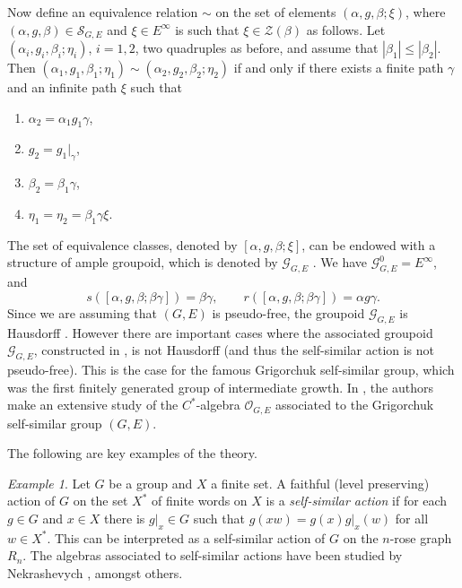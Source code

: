 \documentclass[11pt]{amsart}
\theoremstyle{plain}            %
\theoremstyle{definition}       %
\theoremstyle{definition}       %
\theoremstyle{remark}
\newtheorem{example}[theorem]{Example}
\begin{document}
Now define an equivalence relation $\sim$ on the set of elements $(\alpha,g, \beta;\xi)$, where $(\alpha,g,\beta)\in \mathcal S_{G,E}$ and $\xi \in E^{\infty}$ is such that $\xi \in \mathcal Z (\beta)$ as follows. Let $(\alpha_i,g_i,\beta_i; \eta_i)$, $i=1,2$, two quadruples as before, and assume that $|\beta_1| \le |\beta_2|$. Then $(\alpha_1,g_1,\beta_1; \eta_1)\sim (\alpha_2,g_2,\beta_2; \eta_2)$ if and only if there exists a finite path $\gamma $ and an infinite path $\xi$ such that
\begin{enumerate}
	\item $\alpha_2= \alpha _1 g_1 \gamma $,
	\item $g_2 = g_1|_{\gamma}$,
	\item $\beta_2 = \beta_1 \gamma $,
	\item $\eta_1 = \eta_2 = \beta_1 \gamma \xi $. 
\end{enumerate}

The set of equivalence classes, denoted by $[\alpha,g,\beta; \xi]$, can be endowed with a structure of ample groupoid,
which is denoted by $\mathcal G _{G,E}$ \cite{ep17}. We have $\mathcal G_{G,E}^0 = E^{\infty}$, and
$$s([\alpha, g,\beta; \beta \gamma]) = \beta \gamma , \qquad r([\alpha,g,\beta; \beta \gamma]) = \alpha g \gamma .$$
Since we are assuming that $(G,E)$ is pseudo-free, the groupoid $\mathcal G_{G,E}$ is Hausdorff \cite[Proposition 12.1]{ep17}. However there are important cases where the associated groupoid $\mathcal G_{G,E}$, constructed in \cite{ep17}, is not Hausdorff (and thus the self-similar action is not pseudo-free). 
This is the case for the famous Grigorchuk self-similar group, which was the first finitely generated group of intermediate growth. In \cite{CEPSS}, the authors make an extensive study of the $C^*$-algebra $\mathcal O _{G,E}$ associated to the Grigorchuk self-similar group $(G,E)$. 


The following are key examples of the theory.

\begin{example}
	\label{exam:self-similar-group}
	Let $G$ be a group and $X$ a finite set. A  faithful (level preserving) action of $G$ on the set $X^*$ of finite words on $X$ is a {\it self-similar action} if for each $g\in G$ and $x\in X$ there is
	$g|_x\in G$ such that $g(xw) = g(x)g|_x (w)$ for all $w\in X^*$. This can be interpreted as a self-similar action of $G$ on the $n$-rose graph $R_n$.  The algebras associated to self-similar actions have been studied by Nekrashevych \cite{Nekra}, amongst others. 
\end{example}
\end{document}

